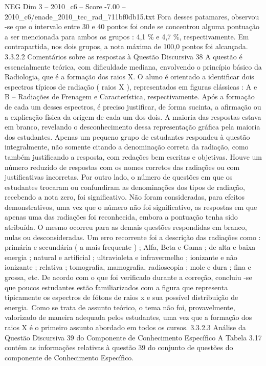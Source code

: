 \begin{textsample}{NEG Dim 3 – 2010\_c6 – Score -7.00 – 2010\_c6/enade\_2010\_tec\_rad\_711bf0db15.txt}
Fora desses patamares, observou -se que o intervalo entre 30 e 40 pontos foi onde se concentrou alguma pontuação a ser mencionada para ambos os grupos : 4,1 \% e 4,7 \%, respectivamente.
Em contrapartida, nos dois grupos, a nota máxima de 100,0 pontos foi alcançada. 3.3.2.2 Comentários sobre as respostas à Questão Discursiva 38 A questão é essencialmente teórica, com dificuldade mediana, envolvendo o princípio básico da Radiologia, que é a formação dos raios X.
O aluno é orientado a identificar dois espectros típicos de radiação ( raios X ), representados em figuras clássicas : A e B – Radiações de Frenagem e Característica, respectivamente.
Após a formação de cada um desses espectros, é preciso justificar, de forma sucinta, a afirmação ou a explicação física da origem de cada um dos dois.
A maioria das respostas estava em branco, revelando o desconhecimento dessa representação gráfica pela maioria dos estudantes.
Apenas um pequeno grupo de estudantes respondeu à questão integralmente, não somente citando a denominação correta da radiação, como também justificando a resposta, com redações bem escritas e objetivas.
Houve um número reduzido de respostas com os nomes corretos das radiações ou com justificativas incorretas.
Por outro lado, o número de questões em que os estudantes trocaram ou confundiram as denominações dos tipos de radiação, recebendo a nota zero, foi significativo.
Não foram consideradas, para efeitos demonstrativos, uma vez que o número não foi significativo, as respostas em que apenas uma das radiações foi reconhecida, embora a pontuação tenha sido atribuída.
O mesmo ocorreu para as demais questões respondidas em branco, nulas ou desconsideradas.
Um erro recorrente foi a descrição das radiações como : primária e secundária ( a mais frequente ) ; Alfa, Beta e Gama ; de alta e baixa energia ; natural e artificial ; ultravioleta e infravermelho ; ionizante e não ionizante ; relativa ; tomografia, mamografia, radioscopia ; mole e dura ; fina e grossa, etc.
De acordo com o que foi verificado durante a correção, concluiu -se que poucos estudantes estão familiarizados com a figura que representa tipicamente os espectros de fótons de raios x e sua possível distribuição de energia.
Como se trata de assunto teórico, o tema não foi, provavelmente, valorizado de maneira adequada pelos estudantes, uma vez que a formação dos raios X é o primeiro assunto abordado em todos os cursos. 3.3.2.3 Análise da Questão Discursiva 39 do Componente de Conhecimento Específico A Tabela 3.17 contém as informações relativas à questão 39 do conjunto de questões do componente de Conhecimento Específico.

\end{textsample}
